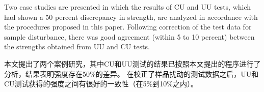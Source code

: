 \documentclass{myarticle}
\begin{document}
\begin{paracol}{2}
    \switchcolumn*

    Two case studies are presented in which the results of CU and UU tests, which had shown a 50 percent discrepancy in strength, are analyzed in accordance with the procedures proposed in this paper. Following correction of the test data for sample disturbance, there was good agreement (within 5 to 10 percent) between the strengths obtained from UU and CU tests.

    \switchcolumn
        
    本文提出了两个案例研究，其中CU和UU测试的结果已按照本文提出的程序进行了分析，结果表明强度存在50$\%$的差异。 在校正了样品扰动的测试数据之后，UU和CU测试获得的强度之间有很好的一致性（在5$\%$到10$\%$之内）。

\end{paracol}
\vspace{10pt}











\end{document}
